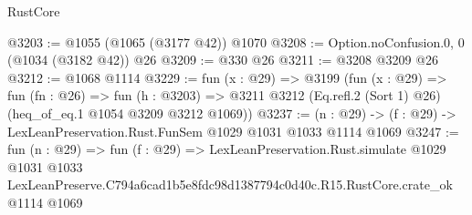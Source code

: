 \begin{lexlean}{RustCore}
\begin{coremodule}
@3203 := @1055 (@1065 (@3177 @42)) @1070
@3208 := Option.noConfusion.{0, 0} (@1034 (@3182 @42)) @26
@3209 := @330 @26
@3211 := @3208 @3209 @26
@3212 := @1068 @1114
@3229 := fun (x : @29) =>
  @3199
    (fun (x : @29) =>
    fun (fn : @26) =>
    fun (h : @3203) =>
    @3211 @3212 (Eq.refl.{2} (Sort 1) @26) (heq_of_eq.{1} @1054 @3209 @3212 @1069))
@3237 := (n : @29) -> (f : @29) -> LexLeanPreservation.Rust.FunSem @1029 @1031 @1033 @1114 @1069
@3247 := fun (n : @29) =>
  fun (f : @29) =>
  LexLeanPreservation.Rust.simulate
    @1029
    @1031
    @1033
    LexLeanPreserve.C794a6cad1b5e8fdc98d1387794c0d40c.R15.RustCore.crate_ok
    @1114
    @1069
\end{coremodule}
\end{lexlean}
